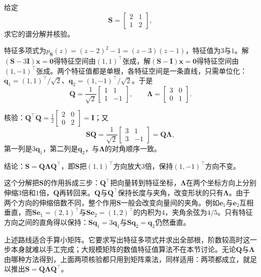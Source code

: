 \begin{example}[二阶对称矩阵的谱分解]
\label{ex:ls-symmetric-spectral-two-by-two}
给定
\[
 \bm S=\begin{bmatrix}2&1\\1&2\end{bmatrix},
\]
求它的谱分解并核验。

特征多项式为$p_{\bm S}(z)=(z-2)^2-1=(z-3)(z-1)$，特征值为$3$与$1$。解$(\bm S-3\bm I)\bm x=\bm0$得特征空间由$(1,1)^\top$张成，解$(\bm S-\bm I)\bm x=\bm0$得特征空间由$(1,-1)^\top$张成。两个特征值都是单根，各特征空间是一条直线，只需单位化：$\bm q_1=(1,1)^\top/\sqrt2$、$\bm q_2=(1,-1)^\top/\sqrt2$。于是
\[
 \bm Q=\frac1{\sqrt2}\begin{bmatrix}1&1\\1&-1\end{bmatrix},\qquad
 \bm\Lambda=\begin{bmatrix}3&0\\0&1\end{bmatrix}.
\]

核验：$\bm Q^\top\bm Q=\frac12\left[\begin{smallmatrix}2&0\\0&2\end{smallmatrix}\right]=\bm I$；又
\[
 \bm S\bm Q=\frac1{\sqrt2}\begin{bmatrix}3&1\\3&-1\end{bmatrix}=\bm Q\bm\Lambda ,
\]
第一列是$3\bm q_1$，第二列是$\bm q_2$，与$\bm\Lambda$的对角顺序一致。

结论：$\bm S=\bm Q\bm\Lambda\bm Q^\top$，即$\bm S$把$(1,1)^\top$方向放大$3$倍，保持$(1,-1)^\top$方向不变。
\end{example}

这个分解把$\bm S$的作用拆成三步：$\bm Q^\top$把向量转到特征坐标，$\bm\Lambda$在两个坐标方向上分别伸缩$3$倍和$1$倍，$\bm Q$再转回来。$\bm Q$与$\bm Q^\top$保持长度与夹角，改变形状的只有$\bm\Lambda$。由于两个方向的伸缩倍数不同，整个作用$\bm S$一般会改变向量间的夹角。例如$\bm e_1$与$\bm e_2$互相垂直，而$\bm S\bm e_1=(2,1)^\top$与$\bm S\bm e_2=(1,2)^\top$的内积为$4$，夹角余弦为$4/5$。只有特征方向之间的直角得以保持：$\bm S\bm q_1=3\bm q_1$与$\bm S\bm q_2=\bm q_2$仍然垂直。

上述路线适合手算小矩阵。它要求写出特征多项式并求出全部根，阶数较高时这一步本身就难以手工完成；大规模矩阵的数值特征值算法不在本节讨论。无论$\bm Q$与$\bm\Lambda$由哪种方法得到，上面两项核验都只用到矩阵乘法，同样适用：两项都成立，就足以推出$\bm S=\bm Q\bm\Lambda\bm Q^\top$。

